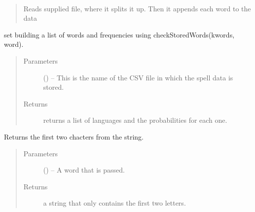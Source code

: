 \documentclass[letterpaper,10pt,english]{sphinxmanual}
\begin{document}
\begin{fulllineitems}
\label{\detokenize{code:hp_spells.count_instances}}~\begin{quote}

Reads supplied file, where it splits it up. Then it appends each word to the data
\end{quote}

set building a list of words and frequencies using checkStoredWords(kwords, word).
\begin{quote}\begin{description}
\item[{Parameters}] \leavevmode
{} () -- This is the name of the CSV file in which the spell data is stored.

\item[{Returns}] \leavevmode
returns a list of languages and the probabilities for each one.

\end{description}\end{quote}

\end{fulllineitems}


\begin{fulllineitems}
\label{\detokenize{code:hp_spells.f}}
Returns the first two chacters from the string.
\begin{quote}\begin{description}
\item[{Parameters}] \leavevmode
{} () -- A word that is passed.

\item[{Returns}] \leavevmode
a string that only contains the first two letters.

\end{description}\end{quote}

\end{fulllineitems}

\end{document}
